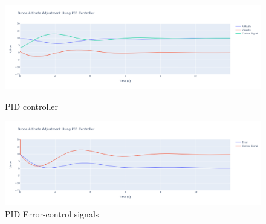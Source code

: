 \documentclass[a4paper,12pt]{article}
\begin{document}
\begin{figure}
    \centering
    \includegraphics[width=1\linewidth,height=0.6
    \linewidth]{photos/pid.png}
    \caption{PID controller}
    \label{fig:enter-label}
    \centering
    \includegraphics[width=1\linewidth,height=0.6
    \linewidth]{photos/pid_error_control.png}
    \caption{PID Error-control signals}
    \label{fig:enter-label}
\end{figure}
\end{document}
